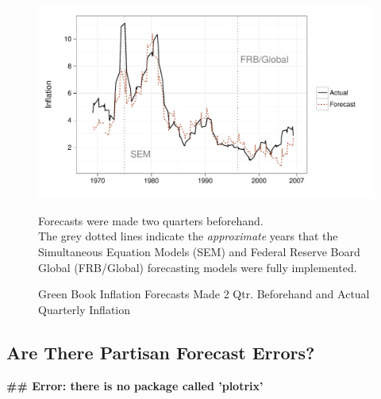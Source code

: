 \documentclass[a4paper]{article}
\begin{document}
\begin{figure}[t]
    \caption{Green Book Inflation Forecasts Made 2 Qtr. Beforehand and Actual Quarterly Inflation}
    \label{absolute}
    \begin{center}
    
\begin{knitrout}
\color{fgcolor}\includegraphics[width=0.8\linewidth]{figure/BaseInflation} 
\end{knitrout}

    
    \end{center}
    \begin{singlespace}
        {\scriptsize{Forecasts were made two quarters beforehand. \\
                     The grey dotted lines indicate the {\emph{approximate}} years that the Simultaneous Equation Models (SEM) and Federal Reserve Board Global (FRB/Global) forecasting models were fully implemented.  
                      }}
    \end{singlespace}
\end{figure}


\subsection{Are There Partisan Forecast Errors?}

\begin{knitrout}
\color{fgcolor}\begin{kframe}
\begin{flushleft}\ttfamily\noindent\bfseries\textcolor{errorcolor}{\#\# Error: there is no package called 'plotrix'}\end{flushleft}\end{kframe}
\end{knitrout}
\end{document}
